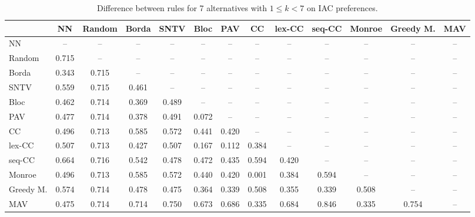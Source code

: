 
\begin{table*}[htbp]
\centering
\begin{tabular}{lcccccccccccc}
\toprule
 & NN & Random & Borda & SNTV & Bloc & PAV & CC & lex-CC & seq-CC & Monroe & Greedy M. & MAV \\
\midrule
NN & -- & -- & -- & -- & -- & -- & -- & -- & -- & -- & -- & -- \\
Random & \cellcolor{blue!71} 0.715 & -- & -- & -- & -- & -- & -- & -- & -- & -- & -- & -- \\
Borda & \cellcolor{blue!34} 0.343 & \cellcolor{blue!71} 0.715 & -- & -- & -- & -- & -- & -- & -- & -- & -- & -- \\
SNTV & \cellcolor{blue!55} 0.559 & \cellcolor{blue!71} 0.715 & \cellcolor{blue!46} 0.461 & -- & -- & -- & -- & -- & -- & -- & -- & -- \\
Bloc & \cellcolor{blue!46} 0.462 & \cellcolor{blue!71} 0.714 & \cellcolor{blue!36} 0.369 & \cellcolor{blue!48} 0.489 & -- & -- & -- & -- & -- & -- & -- & -- \\
PAV & \cellcolor{blue!47} 0.477 & \cellcolor{blue!71} 0.714 & \cellcolor{blue!37} 0.378 & \cellcolor{blue!49} 0.491 & \cellcolor{blue!7} 0.072 & -- & -- & -- & -- & -- & -- & -- \\
CC & \cellcolor{blue!49} 0.496 & \cellcolor{blue!71} 0.713 & \cellcolor{blue!58} 0.585 & \cellcolor{blue!57} 0.572 & \cellcolor{blue!44} 0.441 & \cellcolor{blue!42} 0.420 & -- & -- & -- & -- & -- & -- \\
lex-CC & \cellcolor{blue!50} 0.507 & \cellcolor{blue!71} 0.713 & \cellcolor{blue!42} 0.427 & \cellcolor{blue!50} 0.507 & \cellcolor{blue!16} 0.167 & \cellcolor{blue!11} 0.112 & \cellcolor{blue!38} 0.384 & -- & -- & -- & -- & -- \\
seq-CC & \cellcolor{blue!66} 0.664 & \cellcolor{blue!71} 0.716 & \cellcolor{blue!54} 0.542 & \cellcolor{blue!47} 0.478 & \cellcolor{blue!47} 0.472 & \cellcolor{blue!43} 0.435 & \cellcolor{blue!59} 0.594 & \cellcolor{blue!42} 0.420 & -- & -- & -- & -- \\
Monroe & \cellcolor{blue!49} 0.496 & \cellcolor{blue!71} 0.713 & \cellcolor{blue!58} 0.585 & \cellcolor{blue!57} 0.572 & \cellcolor{blue!44} 0.440 & \cellcolor{blue!42} 0.420 & \cellcolor{blue!0} 0.001 & \cellcolor{blue!38} 0.384 & \cellcolor{blue!59} 0.594 & -- & -- & -- \\
Greedy M. & \cellcolor{blue!57} 0.574 & \cellcolor{blue!71} 0.714 & \cellcolor{blue!47} 0.478 & \cellcolor{blue!47} 0.475 & \cellcolor{blue!36} 0.364 & \cellcolor{blue!33} 0.339 & \cellcolor{blue!50} 0.508 & \cellcolor{blue!35} 0.355 & \cellcolor{blue!33} 0.339 & \cellcolor{blue!50} 0.508 & -- & -- \\
MAV & \cellcolor{blue!47} 0.475 & \cellcolor{blue!71} 0.714 & \cellcolor{blue!71} 0.714 & \cellcolor{blue!75} 0.750 & \cellcolor{blue!67} 0.673 & \cellcolor{blue!68} 0.686 & \cellcolor{blue!33} 0.335 & \cellcolor{blue!68} 0.684 & \cellcolor{blue!84} 0.846 & \cellcolor{blue!33} 0.335 & \cellcolor{blue!75} 0.754 & -- \\
\bottomrule
\end{tabular}

\caption{Difference between rules for 7 alternatives with $1 \leq k < 7$ on IAC preferences.}
\label{tab:rule_distance_heatmap-m=[7]-pref_dist=IAC}
\end{table*}
    